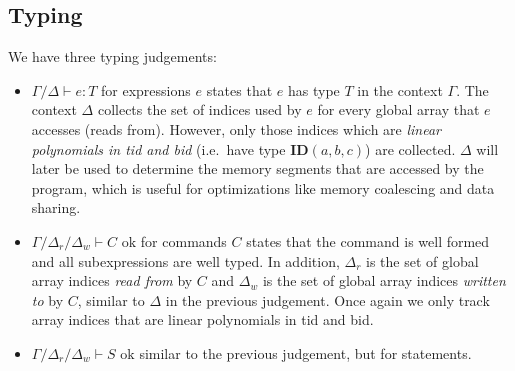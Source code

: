\documentclass{article}
\newcommand{\of}{\!:\!}
\newcommand{\ok}{\text{ ok}}
\newcommand{\id}[3]{\textbf{ID}(#1, #2, #3)}
\renewcommand{\|}{\:|\:}
\begin{document}
\subsection{Typing}
We have three typing judgements: 
\begin{itemize} 
\item $\Gamma/\Delta \vdash e \of T$ for expressions $e$ states that $e$ has type $T$ in the context $\Gamma$. The context $\Delta$ collects the set of indices used by $e$ for every global array that $e$ accesses (reads from). However, only those indices which are \emph{linear polynomials in tid and bid} (i.e.\ have type $\id{a}{b}{c}$) are collected. $\Delta$ will later be used to determine the memory segments that are accessed by the program, which is useful for optimizations like memory coalescing and data sharing.

\item $\Gamma/\Delta_r/\Delta_w \vdash C \ok$ for commands $C$ states that the command is well formed and all subexpressions are well typed. In addition, $\Delta_r$ is the set of global array indices \emph{read from} by $C$ and $\Delta_w$ is the set of global array indices \emph{written to} by $C$, similar to $\Delta$ in the previous judgement. Once again we only track array indices that are linear polynomials in tid and bid.

\item $\Gamma/\Delta_r/\Delta_w \vdash S \ok$ similar to the previous judgement, but for statements.
\end{itemize}
\end{document}
